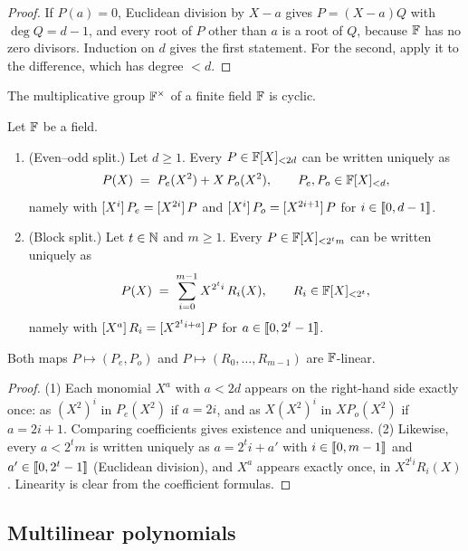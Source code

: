 \begin{proof}
If $P(a) = 0$, Euclidean division by $X - a$ gives $P = (X-a)Q$ with $\deg Q = d-1$, and every root of $P$ other than $a$ is a root of $Q$, because $\mathbb{F}$ has no zero divisors. Induction on $d$ gives the first statement. For the second, apply it to the difference, which has degree $< d$.
\end{proof}

\begin{fact}[{\cite[Theorem~2.8]{LN97}}]\label{fact:cyclic}
The multiplicative group $\mathbb{F}^{\times}$ of a finite field $\mathbb{F}$ is cyclic.
\end{fact}

\begin{lemma}\label{lem:splits}
Let $\mathbb{F}$ be a field.
\begin{enumerate}
  \item (Even--odd split.) Let $d \ge 1$. Every $P \in \mathbb{F}[X]_{<2d}$ can be written uniquely as
  \[
    P(X) \;=\; P_e(X^2) + X\,P_o(X^2), \qquad P_e, P_o \in \mathbb{F}[X]_{<d},
  \]
  namely with $[X^{i}]\,P_e = [X^{2i}]\,P$ and $[X^{i}]\,P_o = [X^{2i+1}]\,P$ for $i \in \llbracket 0, d-1 \rrbracket$.
  \item (Block split.) Let $t \in \mathbb{N}$ and $m \ge 1$. Every $P \in \mathbb{F}[X]_{<2^t m}$ can be written uniquely as
  \[
    P(X) \;=\; \sum_{i=0}^{m-1} X^{2^t i}\, R_i(X), \qquad R_i \in \mathbb{F}[X]_{<2^t},
  \]
  namely with $[X^{a}]\,R_i = [X^{2^t i + a}]\,P$ for $a \in \llbracket 0, 2^t-1 \rrbracket$.
\end{enumerate}
Both maps $P \mapsto (P_e, P_o)$ and $P \mapsto (R_0,\dots,R_{m-1})$ are $\mathbb{F}$-linear.
\end{lemma}

\begin{proof}
(1) Each monomial $X^a$ with $a < 2d$ appears on the right-hand side exactly once: as $(X^2)^{i}$ in $P_e(X^2)$ if $a = 2i$, and as $X (X^2)^{i}$ in $X P_o(X^2)$ if $a = 2i+1$. Comparing coefficients gives existence and uniqueness.
(2) Likewise, every $a < 2^t m$ is written uniquely as $a = 2^t i + a'$ with $i \in \llbracket 0, m-1 \rrbracket$ and $a' \in \llbracket 0, 2^t-1 \rrbracket$ (Euclidean division), and $X^a$ appears exactly once, in $X^{2^t i} R_i(X)$. Linearity is clear from the coefficient formulas.
\end{proof}

\subsection{Multilinear polynomials}\label{sec:prelim:ml}

